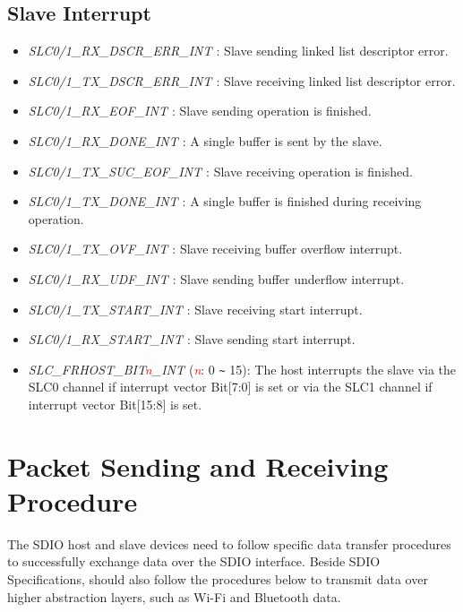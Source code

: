 \documentclass[main\_\_EN.tex]{subfiles}
\begin{document}
\subsection{Slave Interrupt}
\begin{itemize}
\item {\it SLC0/1\_RX\_DSCR\_ERR\_INT \label{int:SLC01RXDSCRERRINT}}: Slave sending linked list descriptor error.
\item {\it SLC0/1\_TX\_DSCR\_ERR\_INT \label{int:SLC01TXDSCRERRINT}}: Slave receiving linked list descriptor error. 
\item {\it SLC0/1\_RX\_EOF\_INT \label{int:SLC01RXEOFINT}}: Slave sending operation is finished.
\item {\it SLC0/1\_RX\_DONE\_INT \label{int:SLC01RXDONEINT}}: A single buffer is sent by the slave.
\item {\it SLC0/1\_TX\_SUC\_EOF\_INT \label{int:SLC01TXSUCEOFINT}}: Slave receiving operation is finished.
\item {\it SLC0/1\_TX\_DONE\_INT \label{int:SLC01TXDONEINT}}: A single buffer is finished during receiving operation. 
\item {\it SLC0/1\_TX\_OVF\_INT \label{int:SLC01TXOVFINT}}: Slave receiving buffer overflow interrupt.
\item {\it SLC0/1\_RX\_UDF\_INT \label{int:SLC01RXUDFINT}}: Slave sending buffer underflow interrupt.
\item {\it SLC0/1\_TX\_START\_INT \label{int:SLC01TXSTARTINT}}: Slave receiving start interrupt.
\item {\it SLC0/1\_RX\_START\_INT \label{int:SLC01RXSTARTINT}}: Slave sending start interrupt.
\item {\it SLC\_FRHOST\_BIT\textcolor{red}{\it{n}}\_INT \label{int:SLCFRHOSTBITnINT}} (\textcolor{red}{\it{n}}: 0 \verb+~+ 15): The host interrupts the slave via the SLC0 channel if interrupt vector Bit[7:0] is set or via the SLC1 channel if interrupt vector Bit[15:8] is set.
\end{itemize}

\section{Packet Sending and Receiving Procedure}

The SDIO host and slave devices need to follow specific data transfer procedures to successfully exchange data over the SDIO interface. Beside SDIO Specifications, \chipname{} should also follow the procedures below to transmit data over higher abstraction layers, such as Wi-Fi and Bluetooth data.
\end{document}
